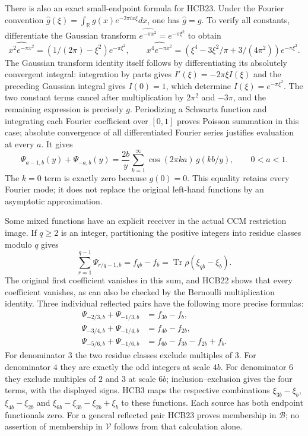 There is also an exact small-endpoint formula for HCB23. Under the
Fourier convention $\widehat g(\xi)=\int_{\mathbb R}
g(x)e^{-2\pi i x\xi}dx$, one has $\widehat g=g$. To verify all
constants, differentiate the Gaussian transform
$\widehat {e^{-\pi x^2}}=e^{-\pi\xi^2}$ to obtain
\[
 \widehat{x^2e^{-\pi x^2}}
   =(1/(2\pi)-\xi^2)e^{-\pi\xi^2},\qquad
 \widehat{x^4e^{-\pi x^2}}
   =(\xi^4-3\xi^2/\pi+3/(4\pi^2))e^{-\pi\xi^2}.
\]
The Gaussian transform identity itself follows by differentiating
its absolutely convergent integral: integration by parts gives
$I'(\xi)=-2\pi\xi I(\xi)$ and the preceding Gaussian integral
gives $I(0)=1$, which determine $I(\xi)=e^{-\pi\xi^2}$.
The two constant terms cancel after multiplication by $2\pi^2$
and $-3\pi$, and the remaining expression is precisely $g$.
Periodizing a Schwartz function and integrating each Fourier
coefficient over $[0,1]$ proves Poisson summation in this case;
absolute convergence of all differentiated Fourier series justifies
evaluation at every $a$. It gives
\begin{equation}\tag{HCB24}
 \Psi_{a-1,b}(y)+\Psi_{-a,b}(y)
    =\frac{2b}{y}\sum_{k=1}^{\infty}
             \cos(2\pi k a)\,g(kb/y),\qquad0<a<1.
\end{equation}
The $k=0$ term is exactly zero because $g(0)=0$. This equality
retains every Fourier mode; it does not replace the original
left-hand functions by an asymptotic approximation.

Some mixed functions have an explicit receiver in the actual CCM
restriction image. If $q\geq2$ is an integer, partitioning the
positive integers into residue classes modulo $q$ gives
\begin{equation}\tag{HCB25}
 \sum_{r=1}^{q-1}\Psi_{r/q-1,b}
      =f_{qb}-f_b=\operatorname{Tr}\rho(\xi_{qb}-\xi_b).
\end{equation}
The original first coefficient vanishes in this sum, and HCB22
shows that every coefficient vanishes, as can also be checked
by the Bernoulli multiplication identity. Three individual
reflected pairs have the following more precise formulas:
\begin{equation}\tag{HCB26}
\begin{split}
 \Psi_{-2/3,b}+\Psi_{-1/3,b}&=f_{3b}-f_b,\\
 \Psi_{-3/4,b}+\Psi_{-1/4,b}&=f_{4b}-f_{2b},\\
 \Psi_{-5/6,b}+\Psi_{-1/6,b}&=f_{6b}-f_{3b}-f_{2b}+f_b.
\end{split}
\end{equation}
For denominator $3$ the two residue classes exclude multiples of
$3$. For denominator $4$ they are exactly the odd integers at
scale $4b$. For denominator $6$ they exclude multiples of $2$
and $3$ at scale $6b$; inclusion--exclusion gives the four terms,
with the displayed signs. HCB3 maps the respective combinations
$\xi_{3b}-\xi_b$, $\xi_{4b}-\xi_{2b}$ and
$\xi_{6b}-\xi_{3b}-\xi_{2b}+\xi_b$ to these functions. Each
source has both endpoint functionals zero. For a general reflected
pair HCB23 proves membership in $\mathcal B$; no assertion of
membership in $\mathcal V$ follows from that calculation alone.

